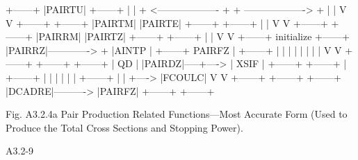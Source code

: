 \begin{center}
\begin{boxedverbatim}




                         +------+
                         |PAIRTU|
                         +------+
                           |  |
    + <------------------- +  + -------------------> +
    |                                                |
    V                                                V
 +------+                                        +------+
 |PAIRTM|                                        |PAIRTE|
 +------+                                        +------+
    |                                                |
    V                                                V
 +------+                                        +------+
 |PAIRRM|                                        |PAIRTZ|
 +------+                                        +------+
    |                                                |
    V                                                V
 +------+   initialize                           +------+
 |PAIRRZ|-------------> +                        |AINTP |
 +------+     PAIRFZ    |                        +------+
    |                   |
    |                   |
    |                   |
    |                   |
    V                   V
 +------+            +------+            +------+
 |  QD  |            |PAIRDZ|-----+----> | XSIF |
 +------+            +------+     |      +------+
   |                    |         |
   |                    |         |      +------+
   |                    |         +----> |FCOULC|
   V                    V                +------+
 +------+            +------+
 |DCADRE|----------> |PAIRFZ|
 +------+            +------+
 
 
     Fig. A3.2.4a  Pair Production Related Functions---Most
                  Accurate Form (Used to Produce the Total
                  Cross Sections and Stopping Power).


 A3.2-9
\end{boxedverbatim} 
\end{center}
\newpage {} 

